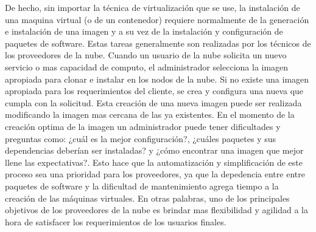 \newpage
De hecho, sin importar la técnica de virtualización que se use, la instalación de una maquina virtual (o de un contenedor) requiere normalmente de la generación e instalación de una imagen y a su vez de la instalación y configuración de paquetes de software. Estas tareas generalmente son realizadas por los técnicos de los proveedores de la nube. Cuando un usuario de la nube solicita un nuevo servicio o mas capacidad de computo, el administrador selecciona la imagen apropiada para clonar e instalar en los nodos de la nube. Si no existe una imagen apropiada para los requerimientos del cliente, se crea y configura una nueva que cumpla con la solicitud. Esta creación de una nueva imagen puede ser realizada modificando la imagen mas cercana de las ya existentes. En el momento de la creación optima de la imagen un administrador puede tener dificultades y preguntas como: ¿cuál es la mejor configuración?, ¿cuáles paquetes y sus dependencias deberían ser instaladas? y ¿cómo encontrar una imagen que mejor llene las expectativas?. Esto hace que la automatización y simplificación de este proceso sea una prioridad para los proveedores, ya que la depedencia entre entre paquetes de software y la dificultad de mantenimiento agrega tiempo a la creación de las máquinas virtuales. En otras palabras, uno de los principales objetivos de los proveedores de la nube es brindar mas flexibilidad y agilidad a la hora de satisfacer los requerimientos de los usuarios finales.\\
\\
